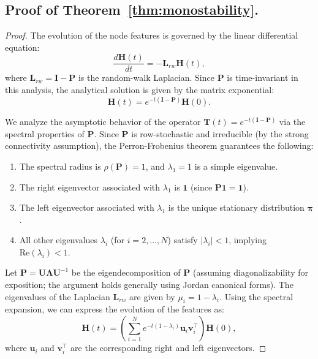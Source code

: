 \documentclass{article}
\theoremstyle{plain}
\theoremstyle{definition}
\theoremstyle{remark}
\begin{document}
\subsection{Proof of Theorem~\ref{thm:monostability}.}
\begin{proof}
    The evolution of the node features is governed by the linear differential equation:
    \begin{equation}
        \frac{d\mathbf{H}(t)}{dt} = -\mathbf{L}_{rw} \mathbf{H}(t),
    \end{equation}
    where $\mathbf{L}_{rw} = \mathbf{I} - \mathbf{P}$ is the random-walk Laplacian. Since $\mathbf{P}$ is time-invariant in this analysis, the analytical solution is given by the matrix exponential:
    \begin{equation}
        \mathbf{H}(t) = e^{-t(\mathbf{I} - \mathbf{P})} \mathbf{H}(0).
    \end{equation}

    We analyze the asymptotic behavior of the operator $\mathbf{T}(t) =
        e^{-t(\mathbf{I} - \mathbf{P})}$ via the spectral properties of $\mathbf{P}$.
    Since $\mathbf{P}$ is row-stochastic and irreducible (by the strong
    connectivity assumption), the Perron-Frobenius theorem guarantees the
    following:
    \begin{enumerate}
        \item The spectral radius is $\rho(\mathbf{P}) = 1$, and $\lambda_1 = 1$ is a simple
              eigenvalue.
        \item The right eigenvector associated with $\lambda_1$ is $\mathbf{1}$ (since
              $\mathbf{P}\mathbf{1} = \mathbf{1}$).
        \item The left eigenvector associated with $\lambda_1$ is the unique stationary
              distribution $\boldsymbol{\pi}$.
        \item All other eigenvalues $\lambda_i$ (for $i=2, \dots, N$) satisfy $|\lambda_i| <
                  1$, implying $\text{Re}(\lambda_i) < 1$.
    \end{enumerate}

    Let $\mathbf{P} = \mathbf{U} \mathbf{\Lambda} \mathbf{U}^{-1}$ be the
    eigendecomposition of $\mathbf{P}$ (assuming diagonalizability for exposition;
    the argument holds generally using Jordan canonical forms). The eigenvalues of
    the Laplacian $\mathbf{L}_{rw}$ are given by $\mu_i = 1 - \lambda_i$. Using the
    spectral expansion, we can express the evolution of the features as:
    \begin{equation}
        \mathbf{H}(t) = \left( \sum_{i=1}^N e^{-t(1 - \lambda_i)} \mathbf{u}_i \mathbf{v}_i^\top \right) \mathbf{H}(0),
    \end{equation}
    where $\mathbf{u}_i$ and $\mathbf{v}_i^\top$ are the corresponding right and left eigenvectors.


\end{proof}
\end{document}
